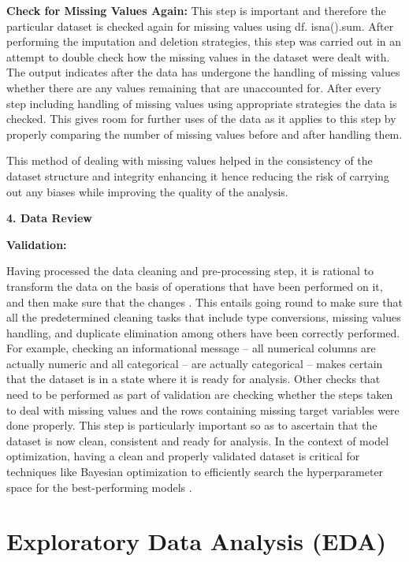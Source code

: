 \documentclass[12pt, a4paper,oneside]{book}
\numberwithin{equation}{section}
\begin{document}
\vspace{7mm}
\textbf{Check for Missing Values Again:} This step is important and therefore the particular dataset is checked again for missing values using df. isna().sum. After performing the imputation and deletion strategies, this step was carried out in an attempt to double check how the missing values in the dataset were dealt with. The output indicates after the data has undergone the handling of missing values whether there are any values remaining that are unaccounted for. After every step including handling of missing values using appropriate strategies the data is checked. This gives room for further uses of the data as it applies to this step by properly comparing the number of missing values before and after handling them.

\vspace{7mm}
This method of dealing with missing values helped in the consistency of the dataset structure and integrity enhancing it hence reducing the risk of carrying out any biases while improving the quality of the analysis.

\textbf{\large 4. Data Review}

\textbf{Validation:}

\vspace{7mm}
Having processed the data cleaning and pre-processing step, it is rational to transform the data on the basis of operations that have been performed on it, and then make sure that the changes . This entails going round to make sure that all the predetermined cleaning tasks that include type conversions, missing values handling, and duplicate elimination among others have been correctly performed. For example, checking an informational message – all numerical columns are actually numeric and all categorical – are actually categorical – makes certain that the dataset is in a state where it is ready for analysis. Other checks that need to be performed as part of validation are checking whether the steps taken to deal with missing values and the rows containing missing target variables were done properly. This step is particularly important so as to ascertain that the dataset is now clean, consistent and ready for analysis. In the context of model optimization, having a clean and properly validated dataset is critical for techniques like Bayesian optimization to efficiently search the hyperparameter space for the best-performing models \cite{bishop2006pattern}.


\vspace{7mm}
\section{Exploratory Data Analysis (EDA)}
\end{document}

